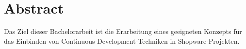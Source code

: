 
\section*{Abstract} \label{sec:00-abstract}

Das Ziel dieser Bachelorarbeit ist die Erarbeitung eines geeigneten Konzepts für das Einbinden von
Continuous-Development-Techniken in Shopware-Projekten.

\clearpage
